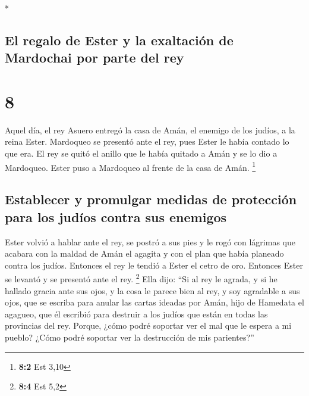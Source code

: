 \begin{paracol}{2}
\begin{otherlanguage}{english}
\end{otherlanguage}

\switchcolumn[0]*

\hypertarget{el-regalo-de-ester-y-la-exaltaciuxf3n-de-mardochai-por-parte-del-rey}{%
\subsection{El regalo de Ester y la exaltación de Mardochai por parte
del
rey}\label{el-regalo-de-ester-y-la-exaltaciuxf3n-de-mardochai-por-parte-del-rey}}

\hypertarget{section-14}{%
\section{8}\label{section-14}}

 Aquel día, el rey Asuero entregó la casa de Amán, el
enemigo de los judíos, a la reina Ester. Mardoqueo se presentó ante el
rey, pues Ester le había contado lo que era.  El rey se
quitó el anillo que le había quitado a Amán y se lo dio a Mardoqueo.
Ester puso a Mardoqueo al frente de la casa de Amán. \footnote{\textbf{8:2}
  Est 3,10}

\hypertarget{establecer-y-promulgar-medidas-de-protecciuxf3n-para-los-juduxedos-contra-sus-enemigos}{%
\subsection{Establecer y promulgar medidas de protección para los judíos
contra sus
enemigos}\label{establecer-y-promulgar-medidas-de-protecciuxf3n-para-los-juduxedos-contra-sus-enemigos}}

 Ester volvió a hablar ante el rey, se postró a sus pies y
le rogó con lágrimas que acabara con la maldad de Amán el agagita y con
el plan que había planeado contra los judíos.  Entonces el
rey le tendió a Ester el cetro de oro. Entonces Ester se levantó y se
presentó ante el rey. \footnote{\textbf{8:4} Est 5,2} 
Ella dijo: ``Si al rey le agrada, y si he hallado gracia ante sus ojos,
y la cosa le parece bien al rey, y soy agradable a sus ojos, que se
escriba para anular las cartas ideadas por Amán, hijo de Hamedata el
agagueo, que él escribió para destruir a los judíos que están en todas
las provincias del rey.  Porque, ¿cómo podré soportar ver
el mal que le espera a mi pueblo? ¿Cómo podré soportar ver la
destrucción de mis parientes?''


\end{paracol}
